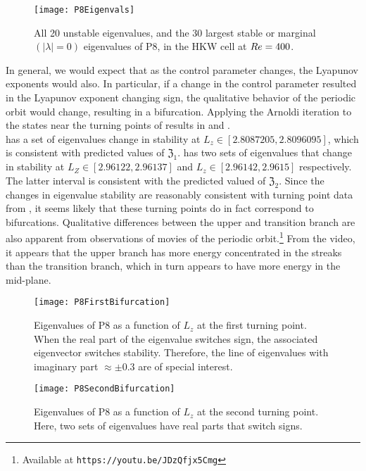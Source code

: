 \begin{figure}[h]
\texttt{[image: P8Eigenvals]}
\caption{All 20 unstable eigenvalues, and the 30 largest stable or marginal $(|\lambda| = 0)$ eigenvalues of P8, in the HKW cell at $Re=400$. }\label{fig:P8Eigenvals}
\end{figure}

In general, we would expect that as the control parameter changes, the Lyapunov exponents would also. In particular, if a change in the control parameter resulted in the Lyapunov exponent changing sign, the qualitative behavior of the periodic orbit would change, resulting in a bifurcation. Applying the Arnoldi iteration to the states near the turning points of  results in  and . \\
\clearpage
  has a set of eigenvalues change in stability at $L_z \in [2.8087205, 2.8096095]$, which is consistent with predicted values of $\mathfrak{Z}_1$.  has two sets of eigenvalues that change in stability at $L_Z \in  [2.96122,2.96137]$ and $L_z \in [ 2.96142,2.9615]$ respectively. The latter interval is consistent with the predicted valued of $\mathfrak{Z}_2$. Since the changes in eigenvalue stability are reasonably consistent with turning point data from , it seems likely that these turning points do in fact correspond to bifurcations. Qualitative differences between the upper and transition branch are also apparent from observations of movies of the periodic orbit.\footnote{Available at {\tt https://youtu.be/JDzQfjx5Cmg}} From the video, it appears that the upper branch has more energy concentrated in the streaks than the transition branch, which in turn appears to have more energy in the mid-plane. \\

\begin{figure}[t]
\texttt{[image: P8FirstBifurcation]}
\caption{Eigenvalues of P8 as a function of $L_z$ at the first turning point. When the real part of the eigenvalue switches sign, the associated eigenvector switches stability. Therefore, the line of eigenvalues with imaginary part  $\approx \pm 0.3$ are of special interest.}\label{fig:P8FirstBifurcation}
\end{figure}


\begin{figure}[h]
\texttt{[image: P8SecondBifurcation]}
\caption{Eigenvalues of P8 as a function of $L_z$ at the second turning point. Here, two sets of eigenvalues have real parts that switch signs. }\label{fig:P8SecondBifurcation}
\end{figure}

